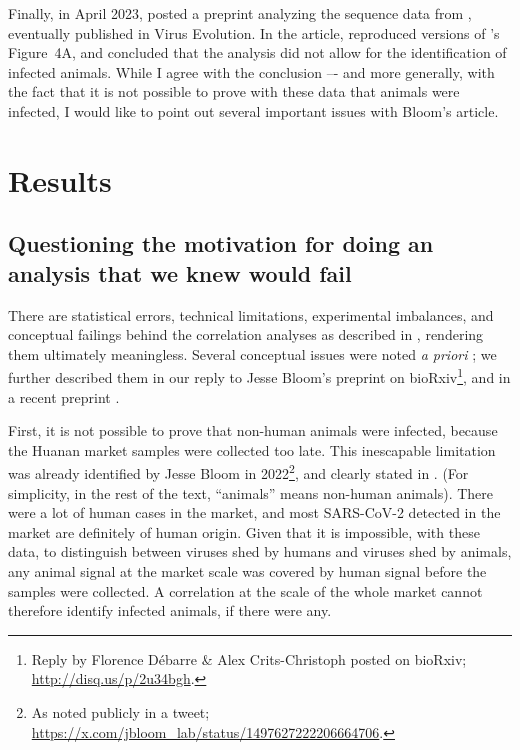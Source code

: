 \documentclass[11pt]{article}
\def \sct {\mbox{SARS-CoV-2}}
\begin{document}
Finally, in April 2023, \citet{Bloom2023bioRxiv} posted a preprint analyzing the sequence data from \citet{Liu2023Nature}, eventually published in Virus Evolution. In the article, \citet{Bloom2023VE} reproduced versions of \citet{Liu2022RS}'s Figure~4A, and concluded that the analysis did not allow for the identification of infected animals. While I agree with the conclusion –- and more generally, with the fact that it is not possible to prove with these data that animals were infected, I would like to point out several important issues with Bloom's article. 

\section{Results}

\subsection{Questioning the motivation for doing an analysis that we knew would fail}

There are statistical errors, technical limitations, experimental imbalances, and conceptual failings behind the correlation analyses as described in \citet{Bloom2023VE}, rendering them ultimately meaningless. Several conceptual issues were noted \textit{a priori} \citep{ACC2023Zenodo}; we further described them in our reply to Jesse Bloom's preprint on bioRxiv\footnote{\label{foot:reply}Reply by Florence D\'ebarre \& Alex Crits-Christoph posted on bioRxiv; \url{http://disq.us/p/2u34bgh}.}, and in a recent preprint \citep{ACC2023bioRxiv}. 

First, it is not possible to prove that non-human animals were infected, because the Huanan market samples were collected too late. This inescapable limitation was already identified by Jesse Bloom in 2022\footnote{As noted publicly in a tweet; \url{https://x.com/jbloom_lab/status/1497627222206664706}.}, and clearly stated in \citet{Bloom2023VE}. (For simplicity, in the rest of the text, ``animals'' means non-human animals). There were a lot of human cases in the market, and most \sct{} detected in the market are definitely of human origin. Given that it is impossible, with these data, to distinguish between viruses shed by humans and viruses shed by animals, any animal signal at the market scale was covered by human signal before the samples were collected. A correlation at the scale of the whole market cannot therefore identify infected animals, if there were any.
\end{document}
